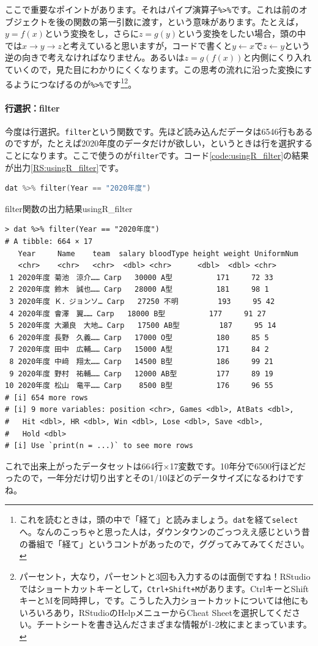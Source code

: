 \documentclass{ltjsbook}
\begin{document}
ここで重要なポイントがあります。それはパイプ演算子\verb|%>%|です。これは前のオブジェクトを後の関数の第一引数に渡す，という意味があります。たとえば，$y=f(x)$という変換をし，さらに$z=g(y)$という変換をしたい場合，頭の中では$x\to y \to z$と考えていると思いますが，コードで書くと$y \leftarrow x$で$z \leftarrow y$という逆の向きで考えなければなりません。あるいは$z=g(f(x))$と内側にくり入れていくので，見た目にわかりにくくなります。この思考の流れに沿った変換にするようにつなげるのが\verb|%>%|です\footnote{これを読むときは，頭の中で「経て」と読みましょう。\verb|dat|を経て\verb|select|へ。なんのこっちゃと思った人は，ダウンタウンのごっつええ感じという昔の番組で「経て」というコントがあったので，ググってみてみてください。}\footnote{パーセント，大なり，パーセントと3回も入力するのは面倒ですね！RStudioではショートカットキーとして，\verb|Ctrl+Shift+M|があります。CtrlキーとShiftキーとMを同時押し，です。こうした入力ショートカットについては他にもいろいろあり，RStudioのHelpメニューからCheat Sheetを選択してください。チートシートを書き込んださまざまな情報が1-2枚にまとまっています。}。

\paragraph{行選択：filter}
今度は行選択。\verb|filter|という関数です。先ほど読み込んだデータは6546行もあるのですが，たとえば2020年度のデータだけが欲しい，というときは行を選択することになります。ここで使うのが\verb|filter|です。コード\ref{code:usingR_filter}の結果が出力\ref{RS:usingR_filter}です。
\begin{lstlisting}[language=c++,label={code:usingR_filter},caption={filter関数}]
dat %>% filter(Year == "2020年度")
\end{lstlisting}
\begin{Rscreen}{filter関数の出力結果}{usingR_filter}
	\begin{verbatim}
> dat %>% filter(Year == "2020年度")
# A tibble: 664 × 17
   Year     Name    team  salary bloodType height weight UniformNum
   <chr>    <chr>   <chr>  <dbl> <chr>      <dbl>  <dbl> <chr>     
 1 2020年度 菊池　涼介…… Carp   30000 A型          171     72 33        
 2 2020年度 鈴木　誠也…… Carp   28000 A型          181     98 1         
 3 2020年度 Ｋ．ジョンソ… Carp   27250 不明         193     95 42        
 4 2020年度 會澤　翼…… Carp   18000 B型          177     91 27        
 5 2020年度 大瀬良　大地… Carp   17500 AB型         187     95 14        
 6 2020年度 長野　久義…… Carp   17000 O型          180     85 5         
 7 2020年度 田中　広輔…… Carp   15000 A型          171     84 2         
 8 2020年度 中﨑　翔太…… Carp   14500 B型          186     99 21        
 9 2020年度 野村　祐輔…… Carp   12000 AB型         177     89 19        
10 2020年度 松山　竜平…… Carp    8500 B型          176     96 55        
# [i] 654 more rows
# [i] 9 more variables: position <chr>, Games <dbl>, AtBats <dbl>,
#   Hit <dbl>, HR <dbl>, Win <dbl>, Lose <dbl>, Save <dbl>,
#   Hold <dbl>
# [i] Use `print(n = ...)` to see more rows
\end{verbatim}
\end{Rscreen}
これで出来上がったデータセットは664行$\times$17変数です。10年分で6500行ほどだったので，一年分だけ切り出すとその1/10ほどのデータサイズになるわけですね。
\end{document}
